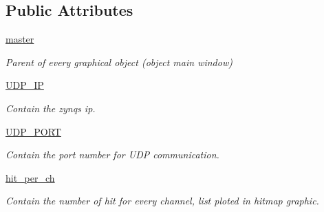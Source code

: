 \subsection*{Public Attributes}
\begin{DoxyCompactItemize}
\item 
\mbox{\label{classreceive_1_1_watchman__graphic__window_a03235614332394871ff2b4564bfa1ede}} 
\mbox{\hyperlink{classreceive_1_1_watchman__graphic__window_a03235614332394871ff2b4564bfa1ede}{master}}
\begin{DoxyCompactList}\small\item\em Parent of every graphical object (object main window) \end{DoxyCompactList}\item 
\mbox{\label{classreceive_1_1_watchman__graphic__window_aeaa1e0bb21319a0670a9bb58c1a4c30f}} 
\mbox{\hyperlink{classreceive_1_1_watchman__graphic__window_aeaa1e0bb21319a0670a9bb58c1a4c30f}{U\+D\+P\+\_\+\+IP}}
\begin{DoxyCompactList}\small\item\em Contain the zynq\textquotesingle{}s ip. \end{DoxyCompactList}\item 
\mbox{\label{classreceive_1_1_watchman__graphic__window_a444ecc478655655d901cce4d07241c89}} 
\mbox{\hyperlink{classreceive_1_1_watchman__graphic__window_a444ecc478655655d901cce4d07241c89}{U\+D\+P\+\_\+\+P\+O\+RT}}
\begin{DoxyCompactList}\small\item\em Contain the port number for U\+DP communication. \end{DoxyCompactList}\item 
\mbox{\label{classreceive_1_1_watchman__graphic__window_a130ab136b3174db7b1687af21f3d25a6}} 
\mbox{\hyperlink{classreceive_1_1_watchman__graphic__window_a130ab136b3174db7b1687af21f3d25a6}{hit\+\_\+per\+\_\+ch}}
\begin{DoxyCompactList}\small\item\em Contain the number of hit for every channel, list ploted in hitmap graphic. \end{DoxyCompactList}\item 

\end{DoxyCompactItemize}
